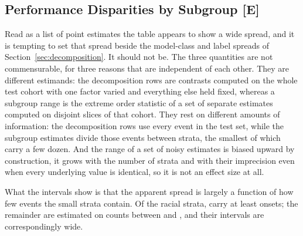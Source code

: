 \subsection{Performance Disparities by Subgroup \texorpdfstring{[E]}{[E]}}

\begin{table}[H]
    \centering\footnotesize
    \caption{AUROC by racial stratum (Variant B, temporal test) with 95\%
    stay-level cluster-bootstrap intervals, stratified within stratum,
    $B = 2{,}000$. Levels are ordered by exposure; interval width grows by
    roughly an order of magnitude from the largest stratum to the smallest.
    Strata carrying fewer than \pcMinSubgroupEvents{} sepsis onsets are marked
    $\dagger$: they are shown so that the composition of the cohort is visible,
    and are neither interpreted nor entered into family E1
    (Section~\ref{sec:equity_strata}). \textbf{[E] exploratory.}}
    \label{tab:equity_performance}
\end{table}

Read as a list of point estimates the table appears to show a wide spread, and
it is tempting to set that spread beside the model-class and label spreads of
Section~\ref{sec:decomposition}. It should not be. The three quantities are not
commensurable, for three reasons that are independent of each other. They are
different estimands: the decomposition rows are contrasts computed on the whole
test cohort with one factor varied and everything else held fixed, whereas a
subgroup range is the extreme order statistic of a set of separate estimates
computed on disjoint slices of that cohort. They rest on different amounts of
information: the decomposition rows use every event in the test set, while the
subgroup estimates divide those events between strata, the smallest of which
carry a few dozen. And the range of a set of noisy estimates is biased upward
by construction, it grows with the number of strata and with their
imprecision even when every underlying value is identical, so it is not an
effect size at all.

What the intervals show is that the apparent spread is largely a function of
how few events the small strata contain. Of the racial strata,
\pcNSubgroupsAboveFloor{} carry at least \pcMinSubgroupEvents{} onsets; the
remainder are estimated on counts between \pcEquityRaceEightNEvents{} and
\pcEquityRaceFourNEvents, and their intervals are correspondingly wide.


